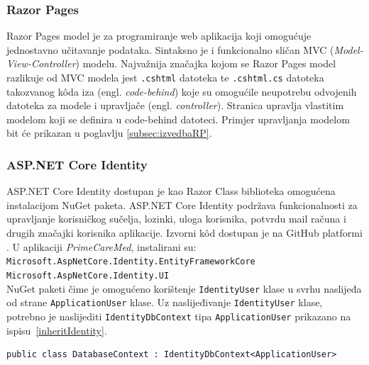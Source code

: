 \subsubsection{Razor Pages}
Razor Pages model je za programiranje web aplikacija koji omogućuje jednostavno učitavanje podataka. Sintaksno je i funkcionalno sličan MVC (\textit{Model-View-Controller}) modelu. Najvažnija značajka kojom se Razor Pages model razlikuje od MVC modela jest \texttt{.cshtml} datoteka te \texttt{.cshtml.cs} datoteka takozvanog k\^oda iza (engl. \textit{code-behind}) koje su omogućile neupotrebu odvojenih datoteka za modele i upravljače (engl. \textit{controller}). Stranica upravlja vlastitim modelom koji se definira u code-behind datoteci\cite{RazorPages}. Primjer upravljanja modelom bit će prikazan u poglavlju \ref{subsec:izvedbaRP}.

\subsubsection{ASP.NET Core Identity}
\label{subsubsec:IdentityCore}
 
ASP.NET Core Identity dostupan je kao Razor Class biblioteka omogućena instalacijom NuGet paketa.  ASP.NET Core Identity podržava funkcionalnosti za upravljanje korisničkog sučelja, lozinki, uloga korisnika, potvrdu mail računa i drugih značajki korisnika aplikacije. Izvorni k\^od dostupan je na GitHub platformi \cite{aspNETGitHub}. U aplikaciji \textit{PrimeCareMed}, instalirani su: \\ \texttt{Microsoft.AspNetCore.Identity.EntityFrameworkCore} \\ \texttt{Microsoft.AspNetCore.Identity.UI}  \\ NuGet paketi čime je omogućeno korištenje \texttt{IdentityUser} klase u svrhu naslijeđa od strane \texttt{ApplicationUser} klase. Uz naslijeđivanje \texttt{IdentityUser} klase, potrebno je naslijediti \texttt{IdentityDbContext} tipa \texttt{ApplicationUser} prikazano na ispisu~\ref{inheritIdentity}.
\begin{lstlisting}[caption={Naslijeđivanje \texttt{IdentityDbContext} klase}, label=inheritIdentity]
public class DatabaseContext : IdentityDbContext<ApplicationUser>
\end{lstlisting}

